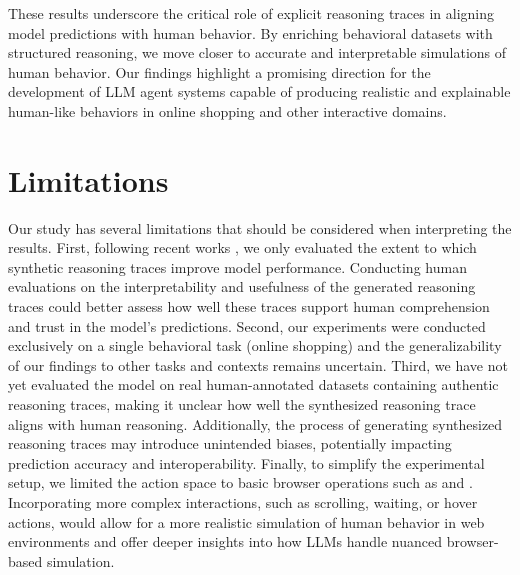 \documentclass[11pt]{article}
\begin{document}
These results underscore the critical role of explicit reasoning traces in aligning model predictions with human behavior.
By enriching behavioral datasets with structured reasoning, we move closer to accurate and interpretable simulations of human behavior.
Our findings highlight a promising direction for the development of LLM agent systems capable of producing realistic and explainable human-like behaviors in online shopping and other interactive domains.

\section*{Limitations}

Our study has several limitations that should be considered when interpreting the results. 
First, following recent works \cite{deepseek-aiDeepSeekR1IncentivizingReasoning2025}, we only evaluated the extent to which synthetic reasoning traces improve model performance.
Conducting human evaluations on the interpretability and usefulness of the generated reasoning traces could better assess how well these traces support human comprehension and trust in the model's predictions.
Second, our experiments were conducted exclusively on a single behavioral task (online shopping) and the generalizability of our findings to other tasks and contexts remains uncertain. Third, we have not yet evaluated the model on real human-annotated datasets containing authentic reasoning traces, making it unclear how well the synthesized reasoning trace aligns with human reasoning. Additionally, the process of generating synthesized reasoning traces may introduce unintended biases, potentially impacting prediction accuracy and interoperability.
Finally, to simplify the experimental setup, we limited the action space to basic browser operations such as  and . Incorporating more complex interactions, such as scrolling, waiting, or hover actions, would allow for a more realistic simulation of human behavior in web environments and offer deeper insights into how LLMs handle nuanced browser-based simulation.





\appendix
\newpage
\end{document}

